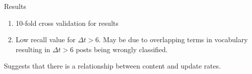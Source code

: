 \documentclass[compress]{beamer}
\begin{document}
\begin{frame}{Results}

\begin{table}
	\label{table:naivebayesresults}
	\caption{Naive Bayes classification results}
\end{table}
\begin{enumerate}
	\item 10-fold cross validation for results
	\item Low recall value for $\Delta t > 6$. May be due to overlapping terms in vocabulary resulting in $\Delta t> 6$ posts being wrongly classified.
\end{enumerate}
Suggests that there is a relationship between content and update rates.
\end{frame}



\end{document}
